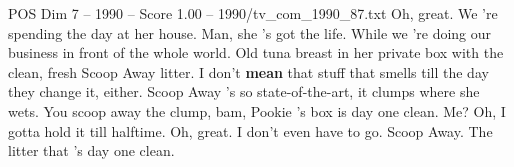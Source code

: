 \begin{textsample}{POS Dim 7 – 1990 – Score 1.00 – 1990/tv\_com\_1990\_87.txt}  \label{ex:f7_pos_064}
Oh, great.
We 're spending the day at her house.
Man, she 's got the life.
While we 're doing our business in front of the whole world.
Old tuna breast in her private box with the clean, fresh Scoop Away litter.
I don't \textbf{mean} that stuff that smells till the day they change it, either.
Scoop Away 's so state-of-the-art, it clumps where she wets.
You scoop away the clump, bam, Pookie 's box is day one clean.
Me?
Oh, I gotta hold it till halftime.
Oh, great.
I don't even have to go.
Scoop Away.
The litter that 's day one clean.

\end{textsample}
